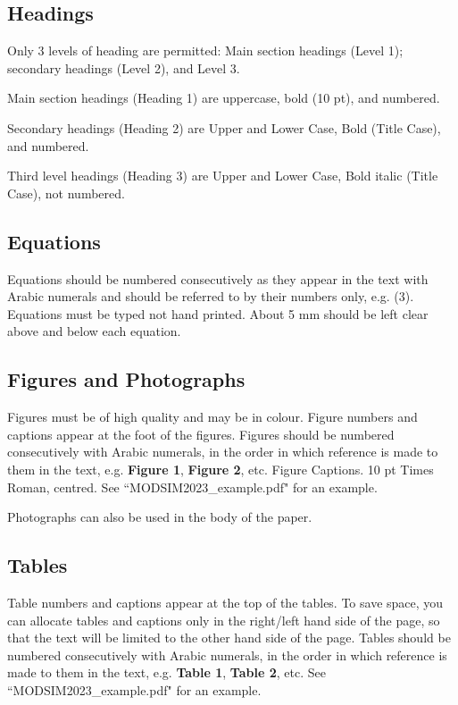 \documentclass[a4paper,fleqn]{article} %
\begin{document}
\subsection{Headings}
Only 3 levels of heading are permitted: Main section headings (Level 1); secondary headings (Level 2), and Level 3. \par
Main section headings (Heading 1) are uppercase, bold (10 pt), and numbered.\par
Secondary headings (Heading 2) are Upper and Lower Case, Bold (Title Case), and numbered. \par
Third level headings (Heading 3) are Upper and Lower Case, Bold italic (Title Case), not numbered. \par

\subsection{Equations}
Equations should be numbered consecutively as they appear in the text with Arabic numerals and should be referred to by their numbers only, e.g. (3).  Equations must be typed not hand printed.  About 5 mm should be left clear above and below each equation.

\subsection{Figures and Photographs}
Figures must be of high quality and may be in colour. Figure numbers and captions appear at the foot of the figures. Figures should be numbered consecutively with Arabic numerals, in the order in which reference is made to them in the text, e.g. {\bfseries Figure 1}, {\bfseries Figure 2}, etc. Figure Captions. 10 pt Times Roman, centred. See ``MODSIM2023\_example.pdf" for an example.  \par
\noindent Photographs can also be used in the body of the paper. \par

\subsection{Tables}
Table numbers and captions appear at the top of the tables. To save space, you can allocate tables and captions only in the right/left hand side of the page, so that the text will be limited to the other hand side of the page. Tables should be numbered consecutively with Arabic numerals, in the order in which reference is made to them in the text, e.g. {\bfseries Table 1}, {\bfseries Table 2}, etc. See ``MODSIM2023\_example.pdf" for an example.\par
\end{document}
